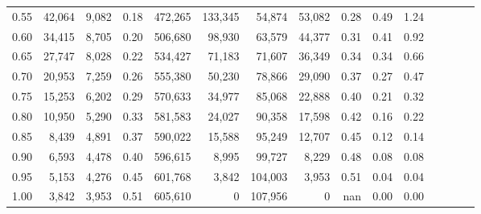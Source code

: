 \begin{tabular}{rrrcrrrrrrrrrrr}
0.55 &  42,064 &  9,082 &                                       0.18 &  472,265 &  133,345 &   54,874 &   53,082 &  0.28 &  0.49 &                         1.24 \\
0.60 &  34,415 &  8,705 &                                       0.20 &  506,680 &   98,930 &   63,579 &   44,377 &  0.31 &  0.41 &                         0.92 \\
0.65 &  27,747 &  8,028 &                                       0.22 &  534,427 &   71,183 &   71,607 &   36,349 &  0.34 &  0.34 &                         0.66 \\
0.70 &  20,953 &  7,259 &                                       0.26 &  555,380 &   50,230 &   78,866 &   29,090 &  0.37 &  0.27 &                         0.47 \\
0.75 &  15,253 &  6,202 &                                       0.29 &  570,633 &   34,977 &   85,068 &   22,888 &  0.40 &  0.21 &                         0.32 \\
0.80 &  10,950 &  5,290 &                                       0.33 &  581,583 &   24,027 &   90,358 &   17,598 &  0.42 &  0.16 &                         0.22 \\
0.85 &   8,439 &  4,891 &                                       0.37 &  590,022 &   15,588 &   95,249 &   12,707 &  0.45 &  0.12 &                         0.14 \\
0.90 &   6,593 &  4,478 &                                       0.40 &  596,615 &    8,995 &   99,727 &    8,229 &  0.48 &  0.08 &                         0.08 \\
0.95 &   5,153 &  4,276 &                                       0.45 &  601,768 &    3,842 &  104,003 &    3,953 &  0.51 &  0.04 &                         0.04 \\
1.00 &   3,842 &  3,953 &                                       0.51 &  605,610 &        0 &  107,956 &        0 &   nan &  0.00 &                         0.00 \\
\bottomrule
\end{tabular}
